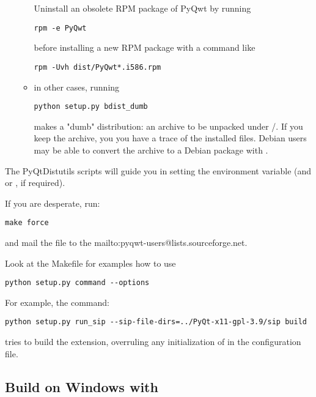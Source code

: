 \documentclass{manual}
\makeatletter
\newcommand{\mailinglist}{\ulink{mailing list}
  {mailto:pyqwt-users@lists.sourceforge.net}}
\makeatother
\begin{document}
\begin{enumerate}
\begin{itemize}
    Uninstall an obsolete RPM package of PyQwt by running
\begin{verbatim}
rpm -e PyQwt
\end{verbatim}
    before installing a new RPM package with a command like
\begin{verbatim}
rpm -Uvh dist/PyQwt*.i586.rpm
\end{verbatim}
    {}
  \item
    in other cases, running
\begin{verbatim}
python setup.py bdist_dumb
\end{verbatim}
    makes a "dumb" distribution: an archive to be unpacked under /.
    If you keep the archive, you you have a trace of the installed files.
    Debian users may be able to convert the archive to a Debian package
    with .
  \end{itemize}
\end{enumerate}

\begin{notice}[note]
  The PyQtDistutils scripts will guide you in setting the environment variable
   (and  or , if required).
\end{notice}

\begin{notice}[note]
  If you are desperate, run:
\begin{verbatim}
make force
\end{verbatim}
  and mail the file  to the \mailinglist{}.
\end{notice}

\begin{notice}[note]
  Look at the Makefile for examples how to use
\begin{verbatim}
python setup.py command --options
\end{verbatim}
  For example, the command:
\begin{verbatim}
python setup.py run_sip --sip-file-dirs=../PyQt-x11-gpl-3.9/sip build
\end{verbatim}
  tries to build the extension, overruling any initialization of
   in the configuration file.
\end{notice}


\subsection{Build on Windows with  \label{win-setup}}
\end{document}
